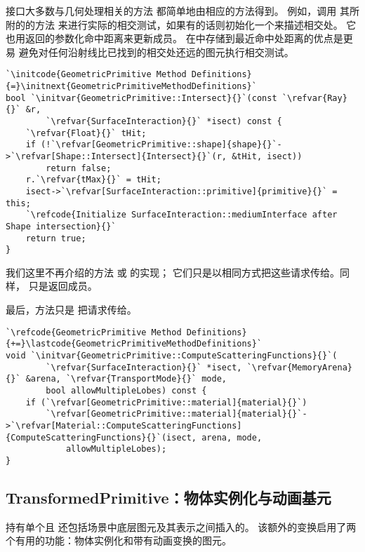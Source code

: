 接口大多数与几何处理相关的方法
都简单地由相应的方法得到。
例如，调用
其所附的的方法
来进行实际的相交测试，如果有的话则初始化一个来描述相交处。
它也用返回的参数化命中距离来更新成员。
在中存储到最近命中处距离的优点是更易
避免对任何沿射线比已找到的相交处还远的图元执行相交测试。
\begin{lstlisting}
`\initcode{GeometricPrimitive Method Definitions}{=}\initnext{GeometricPrimitiveMethodDefinitions}`
bool `\initvar{GeometricPrimitive::Intersect}{}`(const `\refvar{Ray}{}` &r,
        `\refvar{SurfaceInteraction}{}` *isect) const {
    `\refvar{Float}{}` tHit;
    if (!`\refvar[GeometricPrimitive::shape]{shape}{}`->`\refvar[Shape::Intersect]{Intersect}{}`(r, &tHit, isect))
        return false;
    r.`\refvar{tMax}{}` = tHit;
    isect->`\refvar[SurfaceInteraction::primitive]{primitive}{}` = this;
    `\refcode{Initialize SurfaceInteraction::mediumInterface after Shape intersection}{}`
    return true;
}
\end{lstlisting}

我们这里不再介绍的方法
或\linebreak
{}的实现；
它们只是以相同方式把这些请求传给。同样，\linebreak
{}只是返回成员。

最后，方法只是
把请求传给。
\begin{lstlisting}
`\refcode{GeometricPrimitive Method Definitions}{+=}\lastcode{GeometricPrimitiveMethodDefinitions}`
void `\initvar{GeometricPrimitive::ComputeScatteringFunctions}{}`(
        `\refvar{SurfaceInteraction}{}` *isect, `\refvar{MemoryArena}{}` &arena, `\refvar{TransportMode}{}` mode,
        bool allowMultipleLobes) const {
    if (`\refvar[GeometricPrimitive::material]{material}{}`)
        `\refvar[GeometricPrimitive::material]{material}{}`->`\refvar[Material::ComputeScatteringFunctions]{ComputeScatteringFunctions}{}`(isect, arena, mode,
            allowMultipleLobes);
}
\end{lstlisting}

\subsection{TransformedPrimitive：物体实例化与动画基元}\label{sub:TransformedPrimitive：物体实例化与动画基元}
持有单个且
还包括场景中底层图元及其表示之间插入的。
该额外的变换启用了两个有用的功能：物体实例化和带有动画变换的图元。

